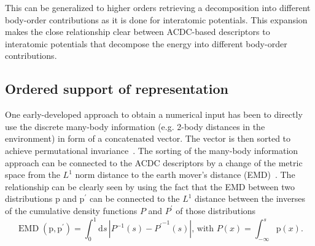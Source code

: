 This can be generalized to higher orders retrieving a decomposition into different body-order contributions as it is done for interatomic potentials.
This expansion makes the close relationship clear between ACDC-based descriptors to interatomic potentials that decompose the energy into different body-order contributions.

\subsection{Ordered support of representation}
One early-developed approach to obtain a numerical input has been to directly use the discrete many-body information (e.g. 2-body distances in the environment) in form of a concatenated vector.
The vector is then sorted to achieve permutational invariance~\cite{hansen2015machine, barker2016localized, huang2016communication}.
The sorting of the many-body information approach can be connected to the ACDC descriptors by a change of the metric space from the $L^1$ norm distance to the earth mover's distance (EMD)~\cite{will+19jcp}.
The relationship can be clearly seen by using the fact that the EMD between two distributions $\textrm{p}$ and $\textrm{p}^\prime$ can be connected to the $L^1$ distance between the inverses of the cumulative density functions $P$ and $P^\prime$ of those distributions
\begin{equation}
  \label{eq:emd_lp_duality}
  \operatorname{EMD}(\textrm{p}, \textrm{p}^\prime)=\int_0^1\mathrm{d}{s}\,\left|P^{-1}(s) -{P^{\prime}}^{-1}(s)\right|\text{, with }P(x)=\int_{-\infty}^s \textrm{p}(x).
\end{equation}
